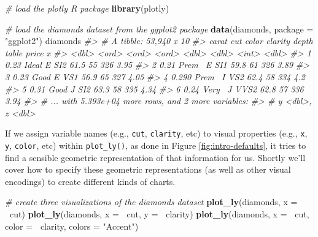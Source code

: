 \documentclass[
  12pt,
]{krantz}
\newenvironment{Shaded}{\begin{snugshade}}{\end{snugshade}}
\newcommand{\CommentTok}[1]{\textcolor[rgb]{0.56,0.35,0.01}{\textit{#1}}}
\newcommand{\DataTypeTok}[1]{\textcolor[rgb]{0.13,0.29,0.53}{#1}}
\newcommand{\KeywordTok}[1]{\textcolor[rgb]{0.13,0.29,0.53}{\textbf{#1}}}
\newcommand{\NormalTok}[1]{#1}
\newcommand{\OperatorTok}[1]{\textcolor[rgb]{0.81,0.36,0.00}{\textbf{#1}}}
\newcommand{\StringTok}[1]{\textcolor[rgb]{0.31,0.60,0.02}{#1}}
\begin{document}
\begin{Shaded}
\begin{Highlighting}[]
\CommentTok{# load the plotly R package}
\KeywordTok{library}\NormalTok{(plotly)}

\CommentTok{# load the diamonds dataset from the ggplot2 package}
\KeywordTok{data}\NormalTok{(diamonds, }\DataTypeTok{package =} \StringTok{"ggplot2"}\NormalTok{)}
\NormalTok{diamonds}
\CommentTok{#> # A tibble: 53,940 x 10}
\CommentTok{#>   carat cut   color clarity depth table price     x}
\CommentTok{#>   <dbl> <ord> <ord> <ord>   <dbl> <dbl> <int> <dbl>}
\CommentTok{#> 1 0.23  Ideal E     SI2      61.5    55   326  3.95}
\CommentTok{#> 2 0.21  Prem~ E     SI1      59.8    61   326  3.89}
\CommentTok{#> 3 0.23  Good  E     VS1      56.9    65   327  4.05}
\CommentTok{#> 4 0.290 Prem~ I     VS2      62.4    58   334  4.2 }
\CommentTok{#> 5 0.31  Good  J     SI2      63.3    58   335  4.34}
\CommentTok{#> 6 0.24  Very~ J     VVS2     62.8    57   336  3.94}
\CommentTok{#> # ... with 5.393e+04 more rows, and 2 more variables:}
\CommentTok{#> #   y <dbl>, z <dbl>}
\end{Highlighting}
\end{Shaded}

If we assign variable names (e.g., \texttt{cut}, \texttt{clarity}, etc) to visual properties (e.g., \texttt{x}, \texttt{y}, \texttt{color}, etc) within \texttt{plot\_ly()}, as done in Figure \ref{fig:intro-defaults}, it tries to find a sensible geometric representation of that information for us. Shortly we'll cover how to specify these geometric representations (as well as other visual encodings) to create different kinds of charts.

\begin{Shaded}
\begin{Highlighting}[]
\CommentTok{# create three visualizations of the diamonds dataset}
\KeywordTok{plot_ly}\NormalTok{(diamonds, }\DataTypeTok{x =} \OperatorTok{~}\NormalTok{cut)}
\KeywordTok{plot_ly}\NormalTok{(diamonds, }\DataTypeTok{x =} \OperatorTok{~}\NormalTok{cut, }\DataTypeTok{y =} \OperatorTok{~}\NormalTok{clarity)}
\KeywordTok{plot_ly}\NormalTok{(diamonds, }\DataTypeTok{x =} \OperatorTok{~}\NormalTok{cut, }\DataTypeTok{color =} \OperatorTok{~}\NormalTok{clarity, }\DataTypeTok{colors =} \StringTok{"Accent"}\NormalTok{)}
\end{Highlighting}
\end{Shaded}
\end{document}
